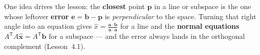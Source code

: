 \documentclass[10pt]{article}
\begin{document}
\vspace{0.10in}

\begin{remindbox}
\small One idea drives the lesson: the \textbf{closest} point $\mathbf{p}$ in a line or subspace is the
one whose leftover \textbf{error} $\mathbf{e}=\mathbf{b}-\mathbf{p}$ is \emph{perpendicular} to the space.
Turning that right angle into an equation gives $\hat{x}=\frac{\mathbf{a}\cdot\mathbf{b}}{\mathbf{a}\cdot\mathbf{a}}$
for a line and the \textbf{normal equations} $A^{\mathsf{T}}A\hat{\mathbf{x}}=A^{\mathsf{T}}\mathbf{b}$ for
a subspace --- and the error always lands in the orthogonal complement (Lesson~4.1).
\end{remindbox}
\end{document}
